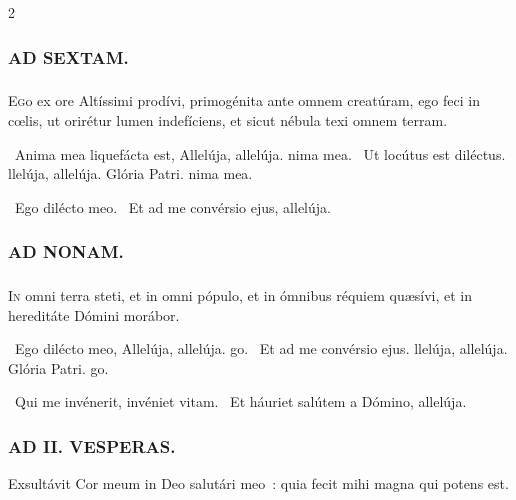 \documentclass[9pt,twoside]{extarticle}
\begin{document}
\begin{multicols}{2}
{\subsubsection*{\center \textsc{AD SEXTAM.}}
\subsubsection*{}
\lettrine{E}go ex ore Altíssimi prodívi, primogénita ante omnem creatúram, ego feci in cœlis, ut orirétur lumen indefíciens, et sicut nébula texi omnem terram.

\begin{tightlist}{}
\item {}~Anima mea liquefácta est, \textred{*} Allelúja, allelúja. nima mea.
~Ut locútus est diléctus. llelúja, allelúja.
Glória Patri. nima mea.
\item {}~Ego dilécto meo. ~Et ad me convérsio ejus, allelúja.
\end{tightlist}

\subsubsection*{\center \textsc{AD NONAM.}}
\subsubsection*{}
\lettrine{I}n omni terra steti, et in omni pópulo, et in ómnibus réquiem quæsívi, et in hereditáte Dómini morábor.

\begin{tightlist}{}
\item {}~Ego dilécto meo, \textred{*} Allelúja, allelúja. go.
~Et ad me convérsio ejus. llelúja, allelúja.
Glória Patri. go.
\item {}~Qui me invénerit, invéniet vitam. ~Et háuriet salútem a Dómino, allelúja.
\end{tightlist}

\subsubsection*{\center \textsc{AD II. VESPERAS.}}
\begin{tightlist}{}
\item {}
\item {}
\item {} Exsultávit Cor meum in Deo salutári meo~: quia fecit mihi magna qui potens est.
\item {}
\end{tightlist}

}
\end{multicols}
\end{document}
